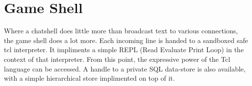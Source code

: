 \documentclass[10pt,letterpaper,twoside]{book}
\begin{document}
\section{Game Shell}
Where a chatshell does little more than broadcast text to various connections, the game shell does a lot more.
Each incoming line is handed to a sandboxed safe tcl interpreter.
It impliments a simple REPL (Read Evaluate Print Loop) in the context of that interpreter.
From this point, the expressive power of the Tcl language can be accessed.
A handle to a private SQL data-store is also available, with a simple hierarchical store implimented on top of it.
\end{document}

